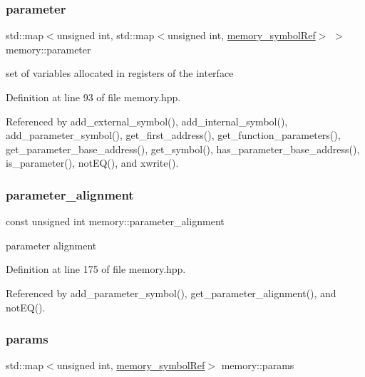 \subsubsection{\texorpdfstring{parameter}{parameter}}
{\footnotesize\ttfamily std\+::map$<$unsigned int, std\+::map$<$unsigned int, \hyperlink{memory__symbol_8hpp_af3608dbc27177447c2d777fa712cc82a}{memory\+\_\+symbol\+Ref}$>$ $>$ memory\+::parameter\hspace{0.3cm}{\ttfamily [private]}}



set of variables allocated in registers of the interface 



Definition at line 93 of file memory.\+hpp.



Referenced by add\+\_\+external\+\_\+symbol(), add\+\_\+internal\+\_\+symbol(), add\+\_\+parameter\+\_\+symbol(), get\+\_\+first\+\_\+address(), get\+\_\+function\+\_\+parameters(), get\+\_\+parameter\+\_\+base\+\_\+address(), get\+\_\+symbol(), has\+\_\+parameter\+\_\+base\+\_\+address(), is\+\_\+parameter(), not\+E\+Q(), and xwrite().

\mbox{\label{classmemory_ac5e94e5f126f12d204d58d96384124f6}} 
\subsubsection{\texorpdfstring{parameter\+\_\+alignment}{parameter\_alignment}}
{\footnotesize\ttfamily const unsigned int memory\+::parameter\+\_\+alignment\hspace{0.3cm}{\ttfamily [private]}}



parameter alignment 



Definition at line 175 of file memory.\+hpp.



Referenced by add\+\_\+parameter\+\_\+symbol(), get\+\_\+parameter\+\_\+alignment(), and not\+E\+Q().

\mbox{\label{classmemory_a8845366310c0ac284b91c2cd561f1ad1}} 
\subsubsection{\texorpdfstring{params}{params}}
{\footnotesize\ttfamily std\+::map$<$unsigned int, \hyperlink{memory__symbol_8hpp_af3608dbc27177447c2d777fa712cc82a}{memory\+\_\+symbol\+Ref}$>$ memory\+::params\hspace{0.3cm}{\ttfamily [private]}}



